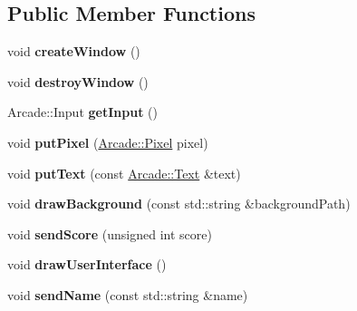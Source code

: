 \subsection*{Public Member Functions}
\begin{DoxyCompactItemize}
\item 
\mbox{\label{class_arcade_1_1_s_f_m_l_a3c6dfca064da57299f0a0e4f8ff5d305}} 
void {\bfseries create\+Window} ()
\item 
\mbox{\label{class_arcade_1_1_s_f_m_l_aa08ae3ab8a8217c237ec599e204a24a9}} 
void {\bfseries destroy\+Window} ()
\item 
\mbox{\label{class_arcade_1_1_s_f_m_l_aeac5b5148a86cba6a8977f6d117e63e4}} 
Arcade\+::\+Input {\bfseries get\+Input} ()
\item 
\mbox{\label{class_arcade_1_1_s_f_m_l_a5ca7ae57f67241a4f5b9ddb0702eaede}} 
void {\bfseries put\+Pixel} (\mbox{\hyperlink{struct_arcade_1_1_pixel}{Arcade\+::\+Pixel}} pixel)
\item 
\mbox{\label{class_arcade_1_1_s_f_m_l_a3bb920bca7cd72db68d8072889eafab5}} 
void {\bfseries put\+Text} (const \mbox{\hyperlink{struct_arcade_1_1_text}{Arcade\+::\+Text}} \&text)
\item 
\mbox{\label{class_arcade_1_1_s_f_m_l_a9db16260c0ffe79f3e177645fc3a8698}} 
void {\bfseries draw\+Background} (const std\+::string \&background\+Path)
\item 
\mbox{\label{class_arcade_1_1_s_f_m_l_a7f7b9589ff88722183be1877d870249c}} 
void {\bfseries send\+Score} (unsigned int score)
\item 
\mbox{\label{class_arcade_1_1_s_f_m_l_ade9704fab4f6a56da66250f29e7a930f}} 
void {\bfseries draw\+User\+Interface} ()
\item 
\mbox{\label{class_arcade_1_1_s_f_m_l_a920d1d15cae228ea47339845f53c01b4}} 
void {\bfseries send\+Name} (const std\+::string \&name)
\item 
\mbox{\label{class_arcade_1_1_s_f_m_l_a6c44bbb72121d8f6d5dc510ba0ec89d9}} 

\end{DoxyCompactItemize}
